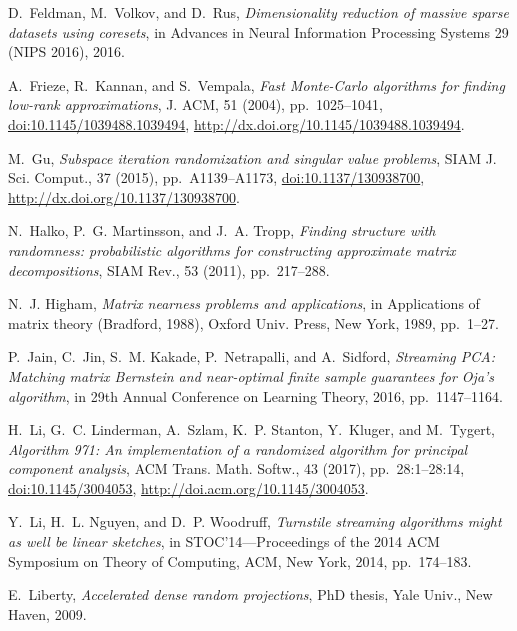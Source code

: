 \documentclass[final]{siamart1116}
\numberwithin{equation}{section}
\numberwithin{theorem}{section}
\numberwithin{figure}{section}
\begin{document}
\begin{thebibliography}{10}
{\sc D.~Feldman, M.~Volkov, and D.~Rus}, {\em Dimensionality reduction of
  massive sparse datasets using coresets}, in Advances in Neural Information
  Processing Systems 29 (NIPS 2016), 2016.

{\sc A.~Frieze, R.~Kannan, and S.~Vempala}, {\em Fast {M}onte-{C}arlo
  algorithms for finding low-rank approximations}, J. ACM, 51 (2004),
  pp.~1025--1041, \href{http://dx.doi.org/10.1145/1039488.1039494}
  {doi:10.1145/1039488.1039494},
  \url{http://dx.doi.org/10.1145/1039488.1039494}.

{\sc M.~Gu}, {\em Subspace iteration randomization and singular value
  problems}, SIAM J. Sci. Comput., 37 (2015), pp.~A1139--A1173,
  \href{http://dx.doi.org/10.1137/130938700} {doi:10.1137/130938700},
  \url{http://dx.doi.org/10.1137/130938700}.

{\sc N.~Halko, P.~G. Martinsson, and J.~A. Tropp}, {\em Finding structure with
  randomness: probabilistic algorithms for constructing approximate matrix
  decompositions}, SIAM Rev., 53 (2011), pp.~217--288.

{\sc N.~J. Higham}, {\em Matrix nearness problems and applications}, in
  Applications of matrix theory ({B}radford, 1988), Oxford Univ. Press, New
  York, 1989, pp.~1--27.

{\sc P.~Jain, C.~Jin, S.~M. Kakade, P.~Netrapalli, and A.~Sidford}, {\em
  Streaming {PCA}: Matching matrix {B}ernstein and near-optimal finite sample
  guarantees for {O}ja's algorithm}, in 29th Annual Conference on Learning
  Theory, 2016, pp.~1147--1164.

{\sc H.~Li, G.~C. Linderman, A.~Szlam, K.~P. Stanton, Y.~Kluger, and
  M.~Tygert}, {\em Algorithm 971: An implementation of a randomized algorithm
  for principal component analysis}, ACM Trans. Math. Softw., 43 (2017),
  pp.~28:1--28:14, \href{http://dx.doi.org/10.1145/3004053}
  {doi:10.1145/3004053}, \url{http://doi.acm.org/10.1145/3004053}.

{\sc Y.~Li, H.~L. Nguyen, and D.~P. Woodruff}, {\em Turnstile streaming
  algorithms might as well be linear sketches}, in S{TOC}'14---{P}roceedings of
  the 2014 {ACM} {S}ymposium on {T}heory of {C}omputing, ACM, New York, 2014,
  pp.~174--183.

{\sc E.~Liberty}, {\em Accelerated dense random projections}, PhD thesis, Yale
  Univ., New Haven, 2009.


\end{thebibliography}
\end{document}
